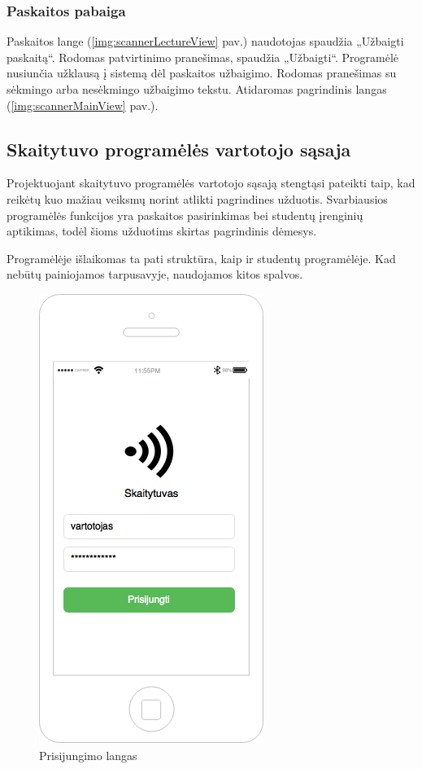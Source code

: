 \documentclass{VUMIFPSkursinis}
\begin{document}
\subsubsection{Paskaitos pabaiga}

Paskaitos lange (\ref{img:scannerLectureView} pav.) naudotojas spaudžia „Užbaigti paskaitą“. Rodomas patvirtinimo pranešimas, spaudžia „Užbaigti“. Programėlė nusiunčia užklausą į sistemą dėl paskaitos užbaigimo. Rodomas pranešimas su sėkmingo arba nesėkmingo užbaigimo tekstu. Atidaromas pagrindinis langas (\ref{img:scannerMainView} pav.).

\subsection{Skaitytuvo programėlės vartotojo sąsaja}

Projektuojant skaitytuvo programėlės vartotojo sąsają stengtąsi pateikti taip, kad reikėtų kuo mažiau veiksmų norint atlikti pagrindines užduotis. Svarbiausios programėlės funkcijos yra paskaitos pasirinkimas bei studentų įrenginių aptikimas, todėl šioms užduotims skirtas pagrindinis dėmesys.

Programėlėje išlaikomas ta pati struktūra, kaip ir studentų programėlėje. Kad nebūtų painiojamos tarpusavyje, naudojamos kitos spalvos.

\begin{figure}[H]
	\centering
	\includegraphics[scale=0.5]{img/kursinio_app_dest_login}
	\caption{Prisijungimo langas}
	\label{img:scannerLoginView}
\end{figure}
\end{document}
